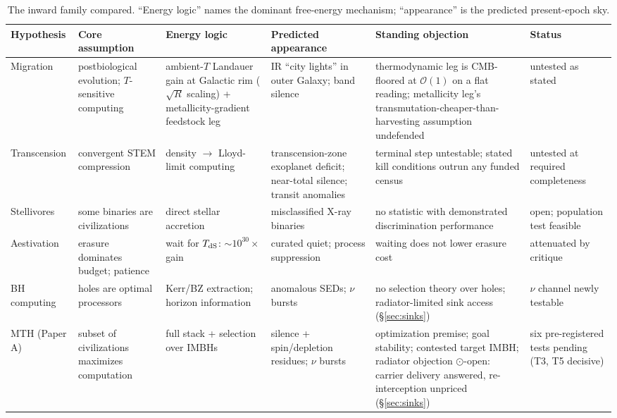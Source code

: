\documentclass[11pt]{article}
\newcommand{\shalf}{\ensuremath{\odot}} %
\begin{document}
\begin{table}[tbp]
\centering
\caption{The inward family compared. ``Energy logic'' names the dominant free-energy mechanism; ``appearance'' is the predicted present-epoch sky.}
\label{tab:matrix}
\scriptsize
\setlength{\tabcolsep}{4pt}
\begin{tabular}{p{2.10cm}p{2.30cm}p{2.20cm}p{2.50cm}p{2.50cm}p{2.15cm}}
\toprule
Hypothesis & Core assumption & Energy logic & Predicted appearance & Standing objection & Status \\
\midrule
Migration \citep{CirkovicBradbury2006} & postbiological evolution; $T$-sensitive computing & ambient-$T$ Landauer gain at Galactic rim ($\sqrt{R}$ scaling) + metallicity-gradient feedstock leg & IR ``city lights'' in outer Galaxy; band silence & thermodynamic leg is CMB-floored at $\mathcal{O}(1)$ on a flat reading; metallicity leg's transmutation-cheaper-than-harvesting assumption undefended & untested as stated \\
Transcension \citep{Smart2012} & convergent STEM compression & density $\to$ Lloyd-limit computing & transcension-zone exoplanet deficit; near-total silence; transit anomalies & terminal step untestable; stated kill conditions outrun any funded census & untested at required completeness \\
Stellivores \citep{Vidal2014,Vidal2016} & some binaries are civilizations & direct stellar accretion & misclassified X-ray binaries & no statistic with demonstrated discrimination performance \citep{Vidal2016} & open; population test feasible \\
Aestivation \citep{Sandberg2016} & erasure dominates budget; patience & wait for $T_{\rm dS}$: $\sim10^{30}\times$ gain & curated quiet; process suppression & waiting does not lower erasure cost \citep{Bennett2019} & attenuated by critique \\
BH computing \citep{Inoue2011,Hsiao2021,Dvali2023} & holes are optimal processors & Kerr/BZ extraction; horizon information & anomalous SEDs; $\nu$ bursts & no selection theory over holes; radiator-limited sink access (\S\ref{sec:sinks}) & $\nu$ channel newly testable \\
MTH (Paper A) & subset of civilizations maximizes computation & full stack + selection over IMBHs & silence + spin/depletion residues; $\nu$ bursts & optimization premise; goal stability; contested target IMBH; radiator objection \shalf-open: carrier delivery answered, re-interception unpriced (\S\ref{sec:sinks}) & six pre-registered tests pending (T3, T5 decisive) \\
\bottomrule
\end{tabular}
\end{table}
\end{document}
